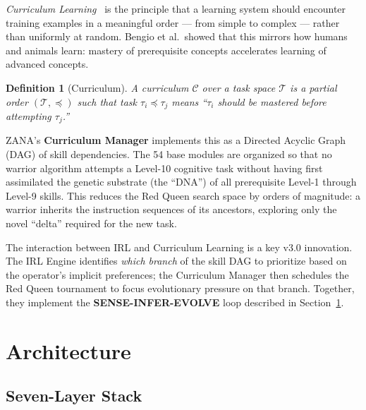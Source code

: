 \documentclass[12pt,a4paper]{article}
\newtheorem{definition}{Definition}[section]
\begin{document}
\emph{Curriculum Learning}~\cite{bengio2009curriculum} is the principle that a learning
system should encounter training examples in a meaningful order --- from simple to complex ---
rather than uniformly at random. Bengio et al.\ showed that this mirrors how humans
and animals learn: mastery of prerequisite concepts accelerates learning of advanced concepts.

\begin{definition}[Curriculum]
A curriculum $\mathcal{C}$ over a task space $\mathcal{T}$ is a partial order
$(\mathcal{T}, \preceq)$ such that task $\tau_i \preceq \tau_j$ means ``$\tau_i$ should
be mastered before attempting $\tau_j$.''
\end{definition}

\begin{tcolorbox}[insight]
ZANA's \textbf{Curriculum Manager} implements this as a Directed Acyclic Graph (DAG) of
skill dependencies. The 54 base modules are organized so that no warrior algorithm
attempts a Level-10 cognitive task without having first assimilated the genetic substrate
(the ``DNA'') of all prerequisite Level-1 through Level-9 skills. This reduces the Red Queen
search space by orders of magnitude: a warrior inherits the instruction sequences of its
ancestors, exploring only the novel ``delta'' required for the new task.
\end{tcolorbox}

The interaction between IRL and Curriculum Learning is a key v3.0 innovation. The IRL
Engine identifies \emph{which branch} of the skill DAG to prioritize based on the operator's
implicit preferences; the Curriculum Manager then schedules the Red Queen tournament to
focus evolutionary pressure on that branch. Together, they implement the
\textbf{SENSE-INFER-EVOLVE} loop described in Section~\ref{sec:arch}.

\section{Architecture}
\label{sec:arch}

\subsection{Seven-Layer Stack}
\end{document}
